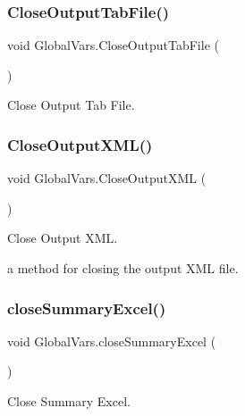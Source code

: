 \subsubsection{\texorpdfstring{CloseOutputTabFile()}{CloseOutputTabFile()}}
{\footnotesize\ttfamily void Global\+Vars.\+Close\+Output\+Tab\+File (\begin{DoxyParamCaption}{ }\end{DoxyParamCaption})\hspace{0.3cm}{\ttfamily [inline]}}



Close Output Tab File. 

\mbox{\label{class_global_vars_a7c7a6c35950707c1982a5a5148294c8d}} 
\subsubsection{\texorpdfstring{CloseOutputXML()}{CloseOutputXML()}}
{\footnotesize\ttfamily void Global\+Vars.\+Close\+Output\+X\+ML (\begin{DoxyParamCaption}{ }\end{DoxyParamCaption})\hspace{0.3cm}{\ttfamily [inline]}}



Close Output X\+ML. 

a method for closing the output X\+ML file. \mbox{\label{class_global_vars_aceec9231298720952c74d5694f19265e}} 
\subsubsection{\texorpdfstring{closeSummaryExcel()}{closeSummaryExcel()}}
{\footnotesize\ttfamily void Global\+Vars.\+close\+Summary\+Excel (\begin{DoxyParamCaption}{ }\end{DoxyParamCaption})\hspace{0.3cm}{\ttfamily [inline]}}



Close Summary Excel. 

\mbox{\label{class_global_vars_a2a6f1b6e75e0925726a16d292525841e}} 
